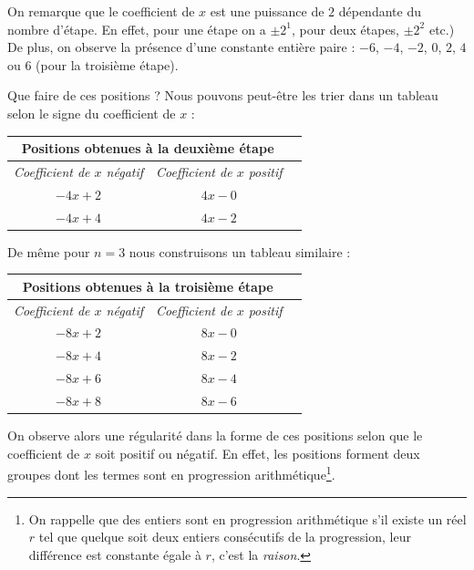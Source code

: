 \documentclass[a4paper,french,12pt]{article}
\begin{document}
On remarque que le coefficient de $x$ est une puissance de $2$ dépendante du nombre d'étape. En effet, pour une étape on a $\pm2^1$, pour deux étapes, $\pm2^2$ etc.) De plus, on observe la présence d'une constante entière paire : $-6$, $-4$, $-2$, $0$, $2$, $4$ ou $6$ (pour la troisième étape).

Que faire de ces positions ? Nous pouvons peut-être les trier dans un tableau selon le signe du coefficient de $x$ :

\begin{center}
\begin{tabular}{|c||c|c|}
    \hline
    \multicolumn{2}{|c|}{\textbf{Positions obtenues à la deuxième étape}} \\ \hline\hline
        \multirow{1}{*}{\emph{Coefficient de $x$ négatif}} & \emph{Coefficient de $x$ positif} \\ \hline\hline
        \multirow{1}{*}{$-4x+2$} & $4x-0$ \\ \hline
        \multirow{1}{*}{$-4x+4$} & $4x-2$ \\
    \hline
\end{tabular}
\end{center}

De même pour $n=3$ nous construisons un tableau similaire :

\begin{center}
\begin{tabular}{|c||c|c|}
    \hline
    \multicolumn{2}{|c|}{\textbf{Positions obtenues à la troisième étape}} \\ \hline\hline
        \multirow{1}{*}{\emph{Coefficient de $x$ négatif}} & \emph{Coefficient de $x$ positif} \\ \hline\hline
        \multirow{1}{*}{$-8x+2$} & $8x-0$ \\ \hline
        \multirow{1}{*}{$-8x+4$} & $8x-2$ \\ \hline
        \multirow{1}{*}{$-8x+6$} & $8x-4$ \\ \hline
        \multirow{1}{*}{$-8x+8$} & $8x-6$ \\
    \hline
\end{tabular}
\end{center}

On observe alors une régularité dans la forme de ces positions selon que le coefficient de $x$ soit positif ou négatif. En effet, les positions forment deux groupes dont les termes sont en progression arithmétique\footnote{On rappelle que des entiers sont en progression arithmétique s'il existe un réel $r$ tel que quelque soit deux entiers consécutifs de la progression, leur différence est constante égale à $r$, c'est la \emph{raison}.}.
\end{document}
